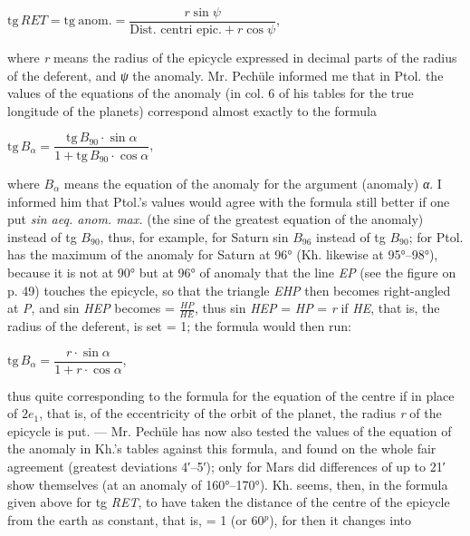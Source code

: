 \documentclass[11pt]{article}
\newcommand{\Pg}[1]{\marginpar{\footnotesize\color{gray}#1}}
\begin{document}
\par\begin{center}$\mathrm{tg}\,RET = \mathrm{tg\ anom.} = \dfrac{r\sin\psi}{\text{Dist. centri epic.}+r\cos\psi}$,\end{center}
\par where \emph{r} means the radius of the epicycle expressed in decimal parts of the radius of the deferent, and \emph{{\greekfont ψ}} the anomaly. Mr. Pechüle informed me that in Ptol. the values of the equations of the anomaly (in col. 6 of his tables for the true longitude of the planets) correspond almost exactly to the formula\par
\par\begin{center}$\mathrm{tg}\,B_{\alpha} = \dfrac{\mathrm{tg}\,B_{90}\cdot\sin\alpha}{1+\mathrm{tg}\,B_{90}\cdot\cos\alpha}$,\end{center}
\par where $B_{\alpha}$ means the equation of the anomaly for the argument (anomaly) \emph{{\greekfont α}}. I informed him that Ptol.'s values would agree with the formula still better if one put \emph{sin aeq. anom. max.} (the sine of the greatest equation of the anomaly) instead of tg $B_{90}$, thus, for example, for Saturn sin $B_{96}$ instead of tg $B_{90}$; for Ptol. has the maximum of the anomaly for Saturn at 96° (Kh. likewise at 95°–98°), because it is not at 90° but at 96° of anomaly that the line \emph{EP} (see the figure on p. 49) touches the epicycle, so that the triangle \emph{EHP} then becomes right-angled at \emph{P}, and sin \emph{HEP} becomes = $\tfrac{HP}{HE}$, thus sin \emph{HEP} = \emph{HP} = \emph{r} if \emph{HE}, that is, the radius of the deferent, is set = 1; the formula would then run:\par
\par\begin{center}$\mathrm{tg}\,B_{\alpha} = \dfrac{r\cdot\sin\alpha}{1+r\cdot\cos\alpha}$,\end{center}
\par \Pg{235}thus quite corresponding to the formula for the equation of the centre if in place of $2e_{1}$, that is, of the eccentricity of the orbit of the planet, the radius \emph{r} of the epicycle is put. — Mr. Pechüle has now also tested the values of the equation of the anomaly in Kh.'s tables against this formula, and found on the whole fair agreement (greatest deviations 4′–5′); only for Mars did differences of up to 21′ show themselves (at an anomaly of 160°–170°). Kh. seems, then, in the formula given above for tg \emph{RET}, to have taken the distance of the centre of the epicycle from the earth as constant, that is, = 1 (or 60$^{p}$), for then it changes into\par
\end{document}
